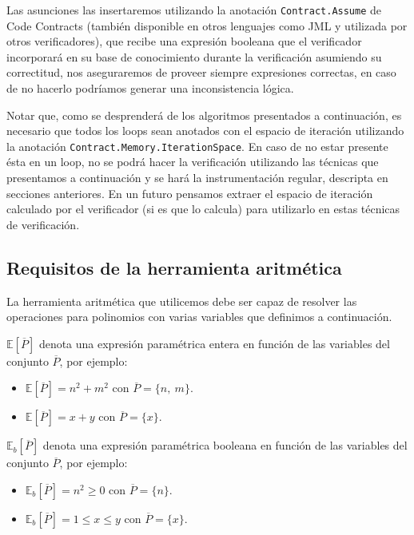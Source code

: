 \documentclass[12pt,a4paper]{article}
\newcommand\mono[1]{\texttt{#1}}
\begin{document}
			Las asunciones las insertaremos utilizando la anotación \mono{Contract.Assume} de Code Contracts (también disponible en otros lenguajes como JML y utilizada por otros verificadores), que recibe una expresión booleana que el verificador incorporará en su base de conocimiento durante la verificación asumiendo su correctitud, nos aseguraremos de proveer siempre expresiones correctas, en caso de no hacerlo podríamos generar una inconsistencia lógica.

			Notar que, como se desprenderá de los algoritmos presentados a continuación, es necesario que todos los loops sean anotados con el espacio de iteración utilizando la anotación \mono{Contract.Memory.IterationSpace}. En caso de no estar presente ésta en un loop, no se podrá hacer la verificación utilizando las técnicas que presentamos a continuación y se hará la instrumentación regular, descripta en secciones anteriores. En un futuro pensamos extraer el espacio de iteración calculado por el verificador (si es que lo calcula) para utilizarlo en estas técnicas de verificación.
		\subsection{Requisitos de la herramienta aritmética}
			La herramienta aritmética que utilicemos debe ser capaz de resolver las operaciones para polinomios con varias variables que definimos a continuación.

			$\mathbb{E}[\overline{P}]$ denota una expresión paramétrica entera en función de las variables del conjunto $\overline{P}$, por ejemplo:

				\begin{itemize}
					\item $\mathbb{E}[\overline{P}] = n^2 + m^2$ con $\overline{P} = \{n,\ m\}$.
					\item $\mathbb{E}[\overline{P}] = x + y$ con $\overline{P} = \{x\}$.
				\end{itemize}

			$\mathbb{E}_b[\overline{P}]$ denota una expresión paramétrica booleana en función de las variables del conjunto $\overline{P}$, por ejemplo:

				\begin{itemize}
					\item $\mathbb{E}_b[\overline{P}] = n^2 \geq 0$ con $\overline{P} = \{n\}$.
					\item $\mathbb{E}_b[\overline{P}] = 1 \leq x \leq y$ con $\overline{P} = \{x\}$.
				\end{itemize}
\end{document}
